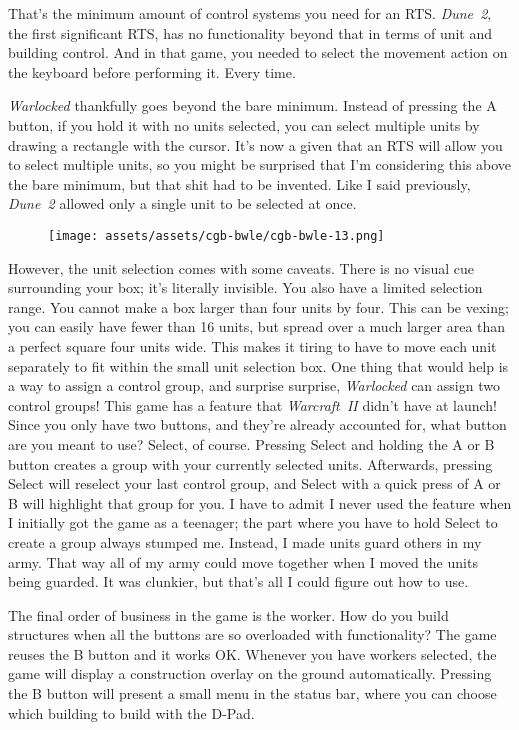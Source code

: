 \documentclass{book}
\begin{document}
That’s the minimum amount of control systems you need for an RTS. \emph{Dune 2}, the first significant RTS, has no functionality beyond that in terms of unit and building control. And in that game, you needed to select the movement action on the keyboard before performing it. Every time.

\emph{Warlocked} thankfully goes beyond the bare minimum. Instead of pressing the A button, if you hold it with no units selected, you can select multiple units by drawing a rectangle with the cursor. It’s now a given that an RTS will allow you to select multiple units, so you might be surprised that I’m considering this above the bare minimum, but that shit had to be invented. Like I said previously, \emph{Dune 2} allowed only a single unit to be selected at once.

\begin{figure}[hbt]
\vskip 10pt
\centering \texttt{[image: assets/assets/cgb-bwle/cgb-bwle-13.png]}
\vskip 6pt
\end{figure}

However, the unit selection comes with some caveats. There is no visual cue surrounding your box; it’s literally invisible. You also have a limited selection range. You cannot make a box larger than four units by four. This can be vexing; you can easily have fewer than 16 units, but spread over a much larger area than a perfect square four units wide. This makes it tiring to have to move each unit separately to fit within the small unit selection box. One thing that would help is a way to assign a control group, and surprise surprise, \emph{Warlocked} can assign two control groups! This game has a feature that \emph{Warcraft II} didn’t have at launch! Since you only have two buttons, and they’re already accounted for, what button are you meant to use? Select, of course. Pressing Select and holding the A or B button creates a group with your currently selected units. Afterwards, pressing Select will reselect your last control group, and Select with a quick press of A or B will highlight that group for you. I have to admit I never used the feature when I initially got the game as a teenager; the part where you have to hold Select to create a group always stumped me. Instead, I made units guard others in my army. That way all of my army could move together when I moved the units being guarded. It was clunkier, but that’s all I could figure out how to use.

The final order of business in the game is the worker. How do you build structures when all the buttons are so overloaded with functionality? The game reuses the B button and it works OK. Whenever you have workers selected, the game will display a construction overlay on the ground automatically. Pressing the B button will present a small menu in the status bar, where you can choose which building to build with the D-Pad.
\end{document}
